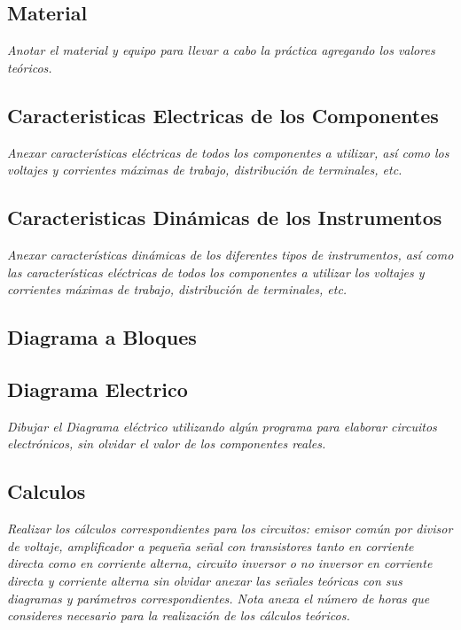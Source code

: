 \documentclass[11pt]{scrartcl}
\newcommand{\indicacion}[1]{\noindent\textit{\small #1}}
\begin{document}
\subsection{Material}

\indicacion{
Anotar el material y equipo para llevar a cabo la práctica agregando los valores teóricos.}

\subsection{Caracteristicas Electricas de los Componentes}
\indicacion{
   Anexar características eléctricas de todos los componentes a utilizar, así como los voltajes y corrientes máximas de trabajo, distribución de terminales, etc.
}

\subsection{Caracteristicas Dinámicas de los Instrumentos}
\indicacion{
  Anexar características dinámicas de los diferentes tipos de instrumentos, así como las características eléctricas de todos los componentes a utilizar los voltajes y corrientes máximas de trabajo, distribución de terminales, etc.
}


\subsection{Diagrama a Bloques}

\subsection{Diagrama Electrico}

\indicacion{
    Dibujar el Diagrama eléctrico utilizando algún programa para elaborar circuitos electrónicos, sin olvidar el valor de los componentes reales.
}

\subsection{Calculos}
\indicacion{
Realizar los cálculos correspondientes para los circuitos: emisor común por divisor de voltaje, amplificador a pequeña señal con transistores tanto en corriente directa como en corriente alterna, circuito inversor o no inversor en corriente directa y corriente alterna sin olvidar anexar las señales teóricas con sus diagramas y parámetros correspondientes. Nota anexa el número de horas que consideres necesario para la realización de los cálculos teóricos.
}
\end{document}

